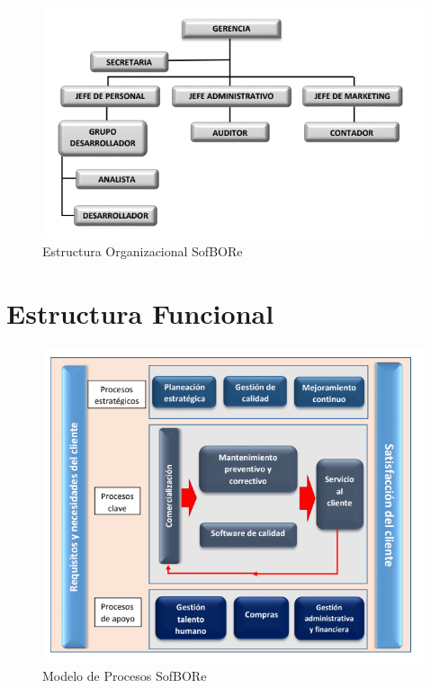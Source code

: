 \begin{figure}[htb]
	\centering
	\includegraphics[width=1.2\linewidth]{libro/capitulo1/img/EstOrgSofBORe.PNG}
	\caption{Estructura Organizacional SofBORe}
\end{figure}

\section{Estructura Funcional}

\begin{figure}[htb]
	\centering
	\includegraphics[width=1.0\linewidth]{libro/capitulo1/img/ProcesosSofBORe.PNG}
	\caption{Modelo de Procesos SofBORe}
\end{figure}
